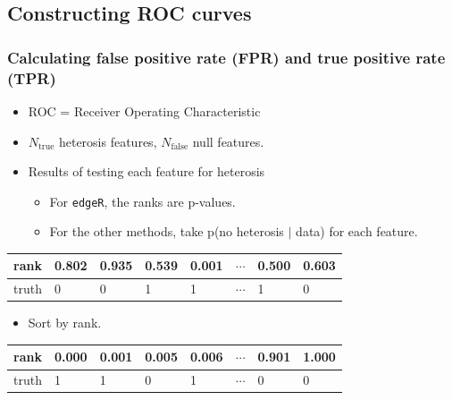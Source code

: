\documentclass[handout]{beamer}
\numberwithin{equation}{section}
\begin{document}
\subsection{Constructing ROC curves}

\begin{frame}
\frametitle{Calculating false positive rate (FPR) and true positive rate (TPR)}

\begin{itemize}
\item ROC = Receiver Operating Characteristic
\pause \item $N_{\text{true}}$ heterosis features, $N_{\text{false}}$ null features.
\pause \item Results of testing each feature for heterosis
\begin{itemize}
\item For {\tt edgeR}, the ranks are p-values.
\item For the other methods, take p(no heterosis $|$ data) for each feature.
\end{itemize}


\end{itemize}

\begin{tabular}{l|l|l|l|l|l|l|l}
rank & 0.802 & 0.935 & 0.539 & 0.001 & $\cdots$ & 0.500 &  0.603  \\ \hline
truth &  0 & 0 & 1 & 1 & $\cdots$ & 1 & 0 
\end{tabular}

\begin{itemize}

\pause \item Sort by rank.
\end{itemize}

\begin{tabular}{l|l|l|l|l|l|l|l}
rank & 0.000 & 0.001 & 0.005 & 0.006 & $\cdots$ & 0.901 & 1.000  \\ \hline
truth &  1 & 1 & 0 & 1 & $\cdots$ & 0 & 0
\end{tabular}
\end{frame}
\end{document}
